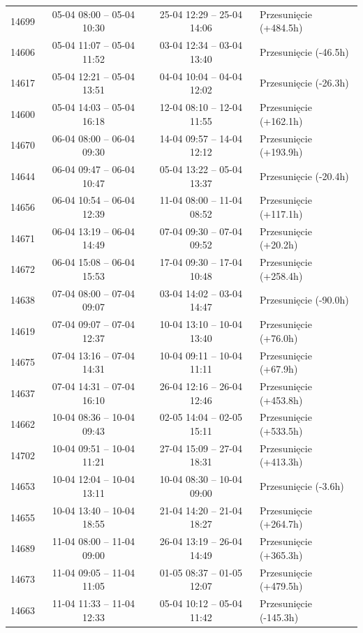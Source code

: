 \begin{table}[htbp]
\begin{tabular}{|r|c|c|l|}
14699 & 05-04 08:00 -- 05-04 10:30 & 25-04 12:29 -- 25-04 14:06 & Przesunięcie (+484.5h) \\ 
14606 & 05-04 11:07 -- 05-04 11:52 & 03-04 12:34 -- 03-04 13:40 & Przesunięcie (-46.5h) \\ 
14617 & 05-04 12:21 -- 05-04 13:51 & 04-04 10:04 -- 04-04 12:02 & Przesunięcie (-26.3h) \\ 
14600 & 05-04 14:03 -- 05-04 16:18 & 12-04 08:10 -- 12-04 11:55 & Przesunięcie (+162.1h) \\ 
14670 & 06-04 08:00 -- 06-04 09:30 & 14-04 09:57 -- 14-04 12:12 & Przesunięcie (+193.9h) \\ 
14644 & 06-04 09:47 -- 06-04 10:47 & 05-04 13:22 -- 05-04 13:37 & Przesunięcie (-20.4h) \\ 
14656 & 06-04 10:54 -- 06-04 12:39 & 11-04 08:00 -- 11-04 08:52 & Przesunięcie (+117.1h) \\ 
14671 & 06-04 13:19 -- 06-04 14:49 & 07-04 09:30 -- 07-04 09:52 & Przesunięcie (+20.2h) \\ 
14672 & 06-04 15:08 -- 06-04 15:53 & 17-04 09:30 -- 17-04 10:48 & Przesunięcie (+258.4h) \\ 
14638 & 07-04 08:00 -- 07-04 09:07 & 03-04 14:02 -- 03-04 14:47 & Przesunięcie (-90.0h) \\ 
14619 & 07-04 09:07 -- 07-04 12:37 & 10-04 13:10 -- 10-04 13:40 & Przesunięcie (+76.0h) \\ 
14675 & 07-04 13:16 -- 07-04 14:31 & 10-04 09:11 -- 10-04 11:11 & Przesunięcie (+67.9h) \\ 
14637 & 07-04 14:31 -- 07-04 16:10 & 26-04 12:16 -- 26-04 12:46 & Przesunięcie (+453.8h) \\ 
14662 & 10-04 08:36 -- 10-04 09:43 & 02-05 14:04 -- 02-05 15:11 & Przesunięcie (+533.5h) \\ 
14702 & 10-04 09:51 -- 10-04 11:21 & 27-04 15:09 -- 27-04 18:31 & Przesunięcie (+413.3h) \\ 
14653 & 10-04 12:04 -- 10-04 13:11 & 10-04 08:30 -- 10-04 09:00 & Przesunięcie (-3.6h) \\ 
14655 & 10-04 13:40 -- 10-04 18:55 & 21-04 14:20 -- 21-04 18:27 & Przesunięcie (+264.7h) \\ 
14689 & 11-04 08:00 -- 11-04 09:00 & 26-04 13:19 -- 26-04 14:49 & Przesunięcie (+365.3h) \\ 
14673 & 11-04 09:05 -- 11-04 11:05 & 01-05 08:37 -- 01-05 12:07 & Przesunięcie (+479.5h) \\ 
14663 & 11-04 11:33 -- 11-04 12:33 & 05-04 10:12 -- 05-04 11:42 & Przesunięcie (-145.3h) \\ 

\end{tabular}
\end{table}
